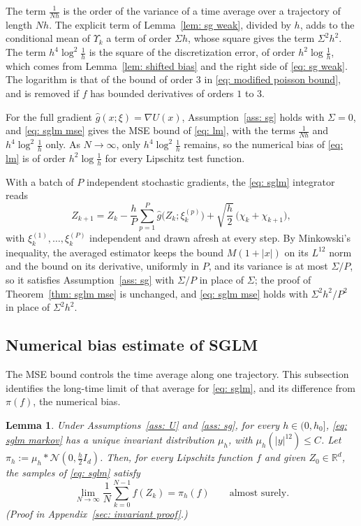 \documentclass{article}
\newtheorem{lemma}{Lemma}
\newcommand{\Le}{\leqslant}
\numberwithin{equation}{section}
\begin{document}
The term $\frac{1}{Nh}$ is the order of the variance of a time average over a trajectory of length $Nh$. The explicit term of Lemma~\ref{lem: sg weak}, divided by $h$, adds to the conditional mean of $\Upsilon_k$ a term of order $\Sigma h$, whose square gives the term $\Sigma^2 h^2$. The term $h^4 \log^2\frac1h$ is the square of the discretization error, of order $h^2 \log\frac1h$, which comes from Lemma~\ref{lem: shifted bias} and the right side of \eqref{eq: sg weak}. The logarithm is that of the bound of order $3$ in \eqref{eq: modified poisson bound}, and is removed if $f$ has bounded derivatives of orders $1$ to $3$.

For the full gradient $\hat g(x;\xi) = \nabla U(x)$, Assumption~\ref{ass: sg} holds with $\Sigma = 0$, and \eqref{eq: sglm mse} gives the MSE bound of \eqref{eq: lm}, with the terms $\frac{1}{Nh}$ and $h^4 \log^2\frac1h$ only. As $N \to \infty$, only $h^4 \log^2\frac1h$ remains, so the numerical bias of \eqref{eq: lm} is of order $h^2 \log\frac1h$ for every Lipschitz test function.

With a batch of $P$ independent stochastic gradients, the \eqref{eq: sglm} integrator reads
\begin{equation*}
    Z_{k+1} = Z_k - \frac hP \sum_{p=1}^{P} \hat g\bigl(Z_k; \xi_k^{(p)}\bigr) + \sqrt{\frac h2}\, \bigl( \chi_k + \chi_{k+1} \bigr) ,
\end{equation*}
with $\xi_k^{(1)}, \dots, \xi_k^{(P)}$ independent and drawn afresh at every step. By Minkowski's inequality, the averaged estimator keeps the bound $M(1 + |x|)$ on its $L^{12}$ norm and the bound on its derivative, uniformly in $P$, and its variance is at most $\Sigma/P$, so it satisfies Assumption~\ref{ass: sg} with $\Sigma/P$ in place of $\Sigma$; the proof of Theorem~\ref{thm: sglm mse} is unchanged, and \eqref{eq: sglm mse} holds with $\Sigma^2 h^2 / P^2$ in place of $\Sigma^2 h^2$. 

\subsection{Numerical bias estimate of SGLM}
\label{subsec: numerical bias}

The MSE bound controls the time average along one trajectory. This subsection identifies the long-time limit of that average for \eqref{eq: sglm}, and its difference from $\pi(f)$, the numerical bias.

\begin{lemma}
\label{lem: invariant}
    Under Assumptions~\ref{ass: U} and \ref{ass: sg}, for every $h \in (0,h_0]$, \eqref{eq: sglm markov} has a unique invariant distribution $\mu_h$, with $\mu_h(|y|^{12}) \Le C$. Let $\pi_h := \mu_h * \mathcal N(0, \frac h2 I_d)$. Then, for every Lipschitz function $f$ and given $Z_0 \in \mathbb R^d$, the samples of \eqref{eq: sglm} satisfy
    \begin{equation}
        \lim_{N \to \infty} \frac1N \sum_{k=0}^{N-1} f(Z_k) = \pi_h(f) \qquad \text{almost surely} .
        \label{eq: ergodic limit}
    \end{equation}
    \emph{(Proof in Appendix~\ref{sec: invariant proof}.)}
\end{lemma}
\end{document}
